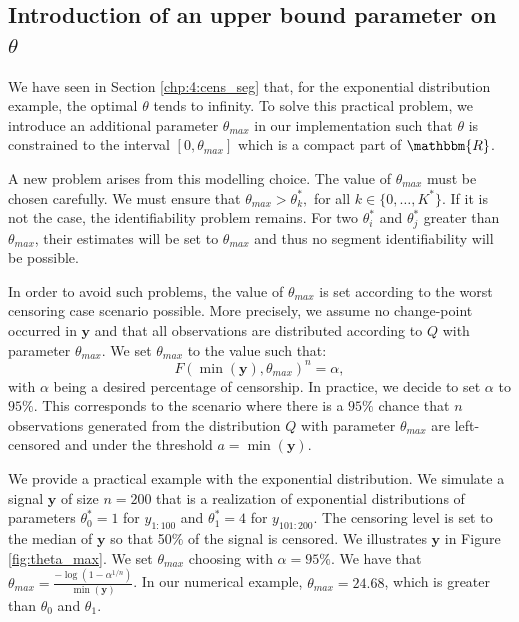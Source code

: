 \subsection{Introduction of an upper bound parameter on $\theta$}

We have seen in Section \ref{chp:4:cens_seg} that, for the exponential distribution example, the optimal $\theta$ tends to infinity. To solve this practical problem, we introduce an additional parameter $\theta_{max}$ in our implementation such that $\theta$ is constrained to the interval $[0,\theta_{max}]$ which is a compact part of $\mathbbm{R}$. 

A new problem arises from this modelling choice. The value of $\theta_{max}$ must be chosen carefully. We must ensure that $\theta_{max}> \theta^*_k,$ for all $k \in \{0,\dots,K^*\}$. If it is not the case, the identifiability problem remains. For two $\theta^*_i$ and $\theta^*_j$  greater than $\theta_{max}$, their estimates will be set to $\theta_{max}$ and thus no segment identifiability will be possible. 

In order to avoid such problems, the value of $\theta_{max}$ is set according to the worst censoring case scenario possible. More precisely, we assume no change-point occurred in $\bm y$ and that all observations are distributed according to $Q$ with parameter $\theta_{max}$. We set $\theta_{max}$ to the value such that: 
\begin{equation}
F(\min(\bm y),\theta_{max})^n = \alpha,
\end{equation}
with $\alpha$ being a desired percentage of censorship. In practice, we decide to set $\alpha$ to $95\%$. This corresponds to the scenario where there is a $95\%$ chance that $n$ observations generated from the distribution $Q$ with parameter $\theta_{max}$ are left-censored and under the threshold $a = \min(\bm y)$. 

We provide a practical example with the exponential distribution. We simulate a signal $\bm y$ of size $n = 200$ that is a realization of exponential distributions of parameters $\theta^*_0 = 1$ for $y_{1:100}$ and $\theta^*_1 = 4$ for $y_{101:200}$. The censoring level is set to the median of $\bm y$ so that 50$\%$ of the signal is censored. We illustrates $\bm y$ in Figure \ref{fig:theta_max}. We set $\theta_{max}$ choosing with $\alpha = 95\%$. We have that $\theta_{max} = \frac{-\log(1-\alpha^{1/n})}{\min(\bm y)}$. In our numerical example, $\theta_{max} = 24.68$, which is greater than $\theta_0$ and $\theta_1$.

